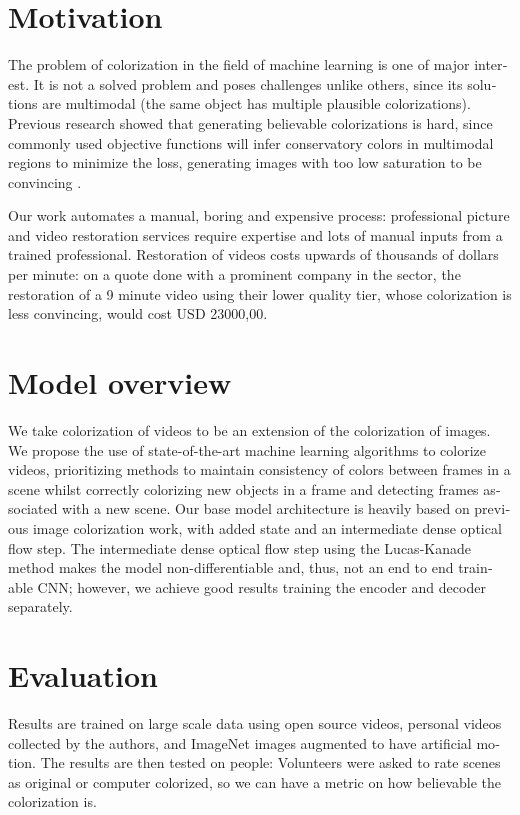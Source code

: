 \documentclass[12pt,openright,oneside,a4paper,english]{abntex2}
\begin{document}
\begin{otherlanguage}{english}
\section{Motivation} \label{sec:Motivation}
The problem of colorization in the field of machine learning is one of major interest. It is not a solved problem and poses challenges unlike others, since its solutions are multimodal (the same object has multiple plausible colorizations). Previous research showed that generating believable colorizations is hard, since commonly used objective functions will infer conservatory colors in multimodal regions to minimize the loss, generating images with too low saturation to be convincing \cite{colorful}.

Our work automates a manual, boring and expensive process: professional picture and video restoration services require expertise and lots of manual inputs from a trained professional. Restoration of videos costs upwards of thousands of dollars per minute: on a quote done with a prominent company in the sector, the restoration of a 9 minute video using their lower quality tier, whose colorization is less convincing, would cost USD 23000,00.

\section{Model overview}

We take colorization of videos to be an extension of the colorization of images. We propose the use of state-of-the-art machine learning algorithms to colorize videos, prioritizing methods to maintain consistency of colors between frames in a scene whilst correctly colorizing new objects in a frame and detecting frames associated with a new scene. Our base model architecture is heavily based on previous image colorization work, with added state and an intermediate dense optical flow step. The intermediate dense optical flow step using the Lucas-Kanade method makes the model non-differentiable and, thus, not an end to end trainable CNN; however, we achieve good results training the encoder and decoder separately.

\section{Evaluation}
Results are trained on large scale data using open source videos, personal videos collected by the authors, and ImageNet images augmented to have artificial motion. %
The results are then tested on people: Volunteers were asked to rate scenes as original or computer colorized, so we can have a metric on how believable the colorization is.


\end{otherlanguage}
\end{document}
